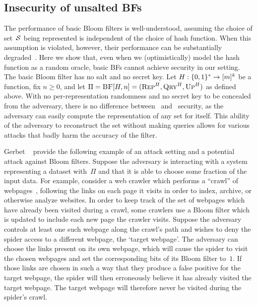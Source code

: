 \subsection{Insecurity of unsalted BFs}\label{sec:bad-bfs}
The performance of basic Bloom filters is well-understood, assuming the choice of
set~$\mathcal{S}$ being represented is independent of the choice of hash function. When
this assumption is violated, however, their performance can be substantially
degraded~\cite{gerbet2015power}.
%
Here we show that, even when we (optimistically) model the hash function as a
random oracle, basic BFs cannot achieve security in our setting.
%
The basic Bloom filter has no salt and no secret key.
Let $H:\{0,1\}^*\to[m]^k$ be a function, fix $n\geq0$, and let
$\Pi = \textnormal{\textsc{BF}}[H,n]=(\textnormal{\textsc{Rep}}^H,\textnormal{\textsc{Qry}}^H,\textnormal{\textsc{Up}}^H)$ as defined above.
%
With no per-representation randomness and no secret key to be concealed from the
adversary, there is no difference between \errep\ and \erreps\ security, as the
adversary can easily compute the representation of any set for itself. This
ability of the adversary to reconstruct the set without making queries allows
for various attacks that badly harm the accuracy of the filter.

Gerbet \etal~\cite{gerbet2015power} provide the following example of an attack
setting and a potential attack against Bloom filters.
Suppose the adversary is interacting with a system representing a dataset
with~$\Pi$ and that it is able to choose some fraction of the input data.  For
example, consider a web crawler which performs a ``crawl'' of webpages~\cite{mapreduce}, following
the links on each page it visits in order to index, archive, or otherwise
analyze websites. In order to keep track of the set of webpages which have
already been visited during a crawl, some crawlers use a Bloom filter which is
updated to include each new page the crawler visits.
Suppose the adversary controls at least one such webpage along the crawl's path
and wishes to deny the spider access to a different webpage, the `target
webpage'. The adversary can choose the links present on its own webpage, which
will cause the spider to visit the chosen webpages and set the corresponding
bits of its Bloom filter to~$1$. If those links are chosen in such a way that they
produce a false positive for the target webpage, the spider will then
erroneously believe it has already visited the target webpage. The target
webpage will therefore never be visited during the spider's crawl.

